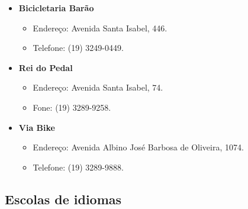 \begin{itemize}
\item  \textbf{Bicicletaria Barão}
\begin{itemize}
\item  Endereço: Avenida Santa Isabel, 446.
\item  Telefone: (19) 3249-0449.
\end{itemize}

\item  \textbf{Rei do Pedal}
\begin{itemize}
\item  Endereço: Avenida Santa Isabel, 74.
\item  Fone: (19) 3289-9258.
\end{itemize}

\item  \textbf{Via Bike}
\begin{itemize}
\item  Endereço: Avenida Albino José Barbosa de Oliveira, 1074.
\item  Telefone: (19) 3289-9888.
\end{itemize}
\end{itemize}

\subsection{Escolas de idiomas}

